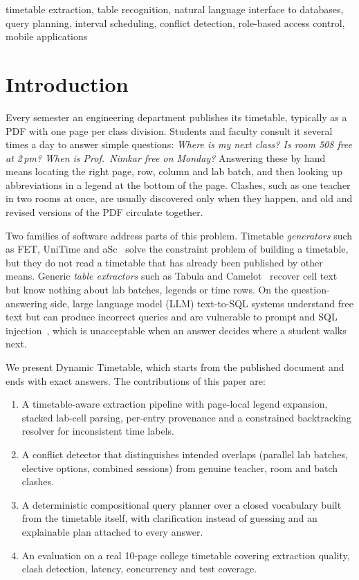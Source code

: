 \documentclass[conference]{IEEEtran}
\begin{document}
\begin{IEEEkeywords}
timetable extraction, table recognition, natural language interface to databases, query planning,
interval scheduling, conflict detection, role-based access control, mobile applications
\end{IEEEkeywords}

\section{Introduction}
Every semester an engineering department publishes its timetable, typically as a PDF with one page per
class division. Students and faculty consult it several times a day to answer simple questions:
\emph{Where is my next class? Is room 508 free at 2\,pm? When is Prof.\ Nimkar free on Monday?} Answering
these by hand means locating the right page, row, column and lab batch, and then looking up abbreviations
in a legend at the bottom of the page. Clashes, such as one teacher in two rooms at once, are usually
discovered only when they happen, and old and revised versions of the PDF circulate together.

Two families of software address parts of this problem. Timetable \emph{generators} such as FET,
UniTime and aSc~\cite{fet,unitime,asc} solve the constraint problem of building a timetable, but they do
not read a timetable that has already been published by other means. Generic \emph{table extractors}
such as Tabula and Camelot~\cite{tabula,camelot} recover cell text but know nothing about lab batches,
legends or time rows. On the question-answering side, large language model (LLM) text-to-SQL systems
understand free text but can produce incorrect queries and are vulnerable to prompt and SQL
injection~\cite{greshake2023,pedro2023}, which is unacceptable when an answer decides where a student
walks next.

We present Dynamic Timetable, which starts from the published document and ends with exact answers.
The contributions of this paper are:
\begin{enumerate}
\item A timetable-aware extraction pipeline with page-local legend expansion, stacked lab-cell parsing,
      per-entry provenance and a constrained backtracking resolver for inconsistent time labels.
\item A conflict detector that distinguishes intended overlaps (parallel lab batches, elective options,
      combined sessions) from genuine teacher, room and batch clashes.
\item A deterministic compositional query planner over a closed vocabulary built from the timetable
      itself, with clarification instead of guessing and an explainable plan attached to every answer.
\item An evaluation on a real 10-page college timetable covering extraction quality, clash detection,
      latency, concurrency and test coverage.
\end{enumerate}
\end{document}

